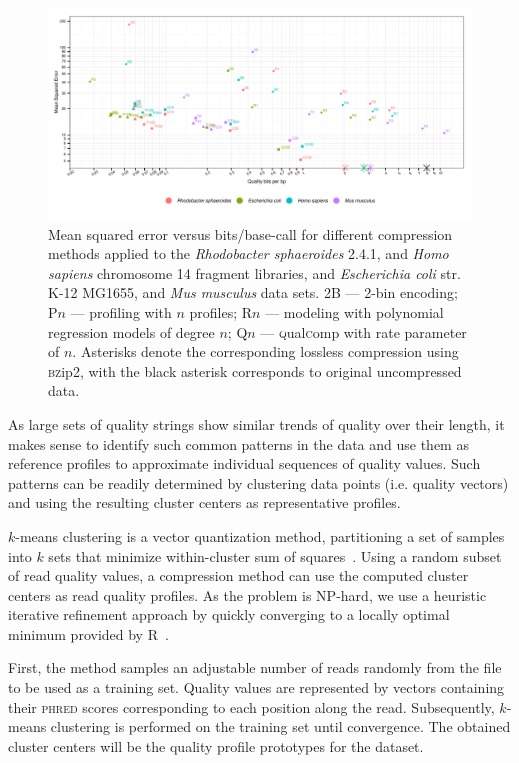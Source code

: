 \documentclass{bioinfo}
\begin{document}
\begin{methods}
\begin{figure}[!tb]%
\centerline{\includegraphics[width=7in]{compression_results.pdf}}
\caption{Mean squared error versus bits/base-call for different
  compression methods applied to the \textit{Rhodobacter sphaeroides}
  2.4.1, and \textit{Homo sapiens} chromosome 14 fragment libraries,
  and \textit{Escherichia coli} str. K-12 MG1655, and \textit{Mus
    musculus} data sets. 2B --- 2-bin encoding; P$n$ --- profiling
  with $n$ profiles; R$n$ --- modeling with polynomial regression
  models of degree $n$; Q$n$ --- \textsc{q}ual\textsc{c}omp with rate parameter of
  $n$. Asterisks denote the corresponding lossless compression using
  \textsc{bz}ip2, with the black asterisk corresponds to original uncompressed
  data.}
\label{fig:mse_vs_bpbp}
\end{figure}

As large sets of quality strings show similar trends of quality over
their length, it makes sense to identify such common patterns in the
data and use them as reference profiles to approximate individual
sequences of quality values. Such patterns can be readily determined by
clustering data points (i.e. quality vectors) and using the resulting
cluster centers as representative profiles.

$k$-means clustering is a vector quantization method, partitioning a
set of samples into $k$ sets that minimize within-cluster sum of
squares~\citep{macqueen1967some}. Using a random subset of read
quality values, a compression method can use the computed cluster
centers as read quality profiles. As the problem is NP-hard, we use a
heuristic iterative refinement approach by quickly converging to a
locally optimal minimum provided by R~\citep{hartigan1979algorithm}.

First, the method samples an adjustable number of reads
randomly from the file to be used as a training set. Quality values
are represented by vectors containing their \textsc{phred} scores
corresponding to each position along the read. Subsequently, $k$-means
clustering is performed on the training set until convergence. The
obtained cluster centers will be the quality profile prototypes for
the dataset.


\end{methods}
\end{document}
